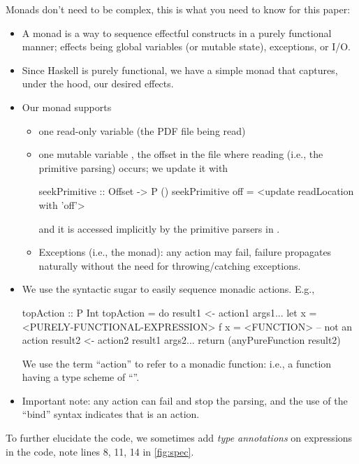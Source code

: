 Monads don't need to be complex, this is what you need to know
for this paper:
\begin{itemize}
  \item A monad is a way to sequence effectful constructs in a purely
    functional manner; effects being global variables (or mutable
    state), exceptions, or I/O.
  \item Since Haskell is purely functional, we have a simple monad
     that captures, under the hood, our desired effects.
  \item Our  monad supports
    \begin{itemize}
    \item one read-only variable (the PDF file being read)
    \item one mutable variable \rdloc{}, the offset in the file where
      reading (i.e., the primitive parsing) occurs; we update it
      with
  \begin{codeNoExecute}
  seekPrimitive :: Offset -> P ()
  seekPrimitive off = <update readLocation with 'off'>
  \end{codeNoExecute}
        and it is accessed
      implicitly by the primitive parsers in .
    \item Exceptions (i.e., the  monad): any action
      may fail, failure propagates naturally without the need for
      throwing/catching exceptions.
    \end{itemize}
\item We use the  syntactic sugar to easily sequence
  monadic actions.
  E.g.,
  \begin{codeNoExecute}
  topAction :: P Int
  topAction = do
              result1 <- action1 args1...
              let x = <PURELY-FUNCTIONAL-EXPRESSION>
                  f x = <FUNCTION> -- not an action
              result2 <- action2 result1 args2...
              return (anyPureFunction result2)
  \end{codeNoExecute}
  We use the term ``action'' to refer to a monadic function:
  i.e., a function having a type scheme of ``''.
\item Important note: any action can fail and stop the parsing,
  and the use of the  ``bind'' syntax indicates
  that  is an action.
\end{itemize}

To further elucidate the code, we sometimes add \emph{type
annotations} on expressions in the code, note lines 8, 11, 14 in
\cref{fig:spec}.

